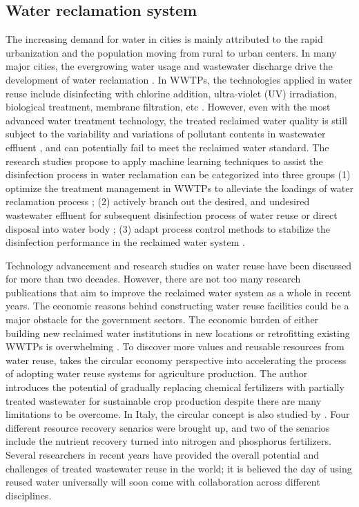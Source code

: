 \subsection{Water reclamation system}
The increasing demand for water in cities is mainly attributed to the rapid urbanization and the population moving from rural to urban centers. In many major cities, the evergrowing water usage and wastewater discharge drive the development of water reclamation \citep{lyuWastewaterReclamationReuse2016}. In WWTPs, the technologies applied in water reuse include disinfecting with chlorine addition, ultra-violet (UV) irradiation, biological treatment, membrane filtration, etc \citep{norton-brandaoReclamationUsedUrban2013}. However, even with the most advanced water treatment technology, the treated reclaimed water quality is still subject to the variability and variations of pollutant contents in wastewater effluent \citep{chenAssessingWastewaterReclamation2003}, and can potentially fail to meet the reclaimed water standard. The research studies propose to apply machine learning techniques to assist the disinfection process in water reclamation can be categorized into three groups (1) optimize the treatment management in WWTPs to alleviate the loadings of water reclamation process \citep{al-ghazawiUseArtificialNeural2021,vietEnhancementMembraneSystem2021}; (2) actively branch out the desired, and undesired wastewater effluent for subsequent disinfection process of water reuse or direct disposal into water body \citep{chenAssessingWastewaterReclamation2003}; (3) adapt process control methods to stabilize the disinfection performance in the reclaimed water system \citep{demirFeedbackControlChlorine2014a}. 

Technology advancement and research studies on water reuse have been discussed for more than two decades. However, there are not too many research publications that aim to improve the reclaimed water system as a whole in recent years. The economic reasons behind constructing water reuse facilities could be a major obstacle for the government sectors. The economic burden of either building new reclaimed water institutions in new locations or retrofitting existing WWTPs is overwhelming \citep{adewumiTreatedWastewaterReuse2010}. To discover more values and reusable resources from water reuse, \citet{chojnackaTransitionConventionalIrrigation2020} takes the circular economy perspective into accelerating the process of adopting water reuse systems for agriculture production. The author introduces the potential of gradually replacing chemical fertilizers with partially treated wastewater for sustainable crop production despite there are many limitations to be overcome. In Italy, the circular concept is also studied by \citet{colellaChallengesOpportunitiesMore2021}. Four different resource recovery senarios were brought up, and two of the senarios include the nutrient recovery turned into nitrogen and phosphorus fertilizers. Several researchers in recent years have provided the overall potential and challenges of treated wastewater reuse in the world; it is believed the day of using reused water universally will soon come with collaboration across different disciplines. 

